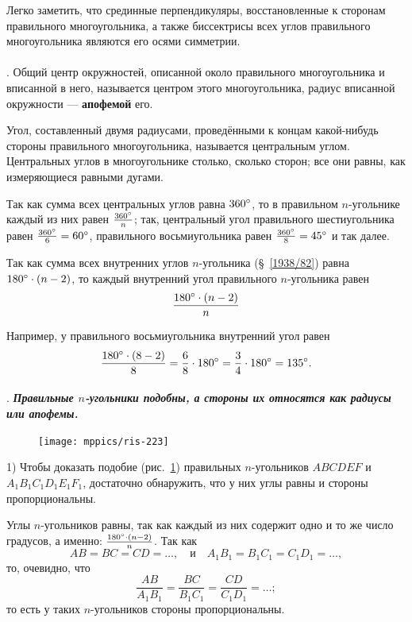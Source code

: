 \documentclass[oneside]{book}
\makeatletter
\newcommand{\rindex}[2][\imki@jobname]{%
  \index[#1]{\detokenize{#2}}%
}
\makeatother
\begin{document}
Легко заметить, что срединные перпендикуляры, восстановленные к сторонам правильного многоугольника, а также биссектрисы всех углов правильного многоугольника являются его осями симметрии.

\paragraph{}\label{1938/217}
.
Общий центр окружностей, описанной около правильного многоугольника и вписанной в него, называется центром этого многоугольника, радиус вписанной окружности — \rindex{апофема}\textbf{апофемой} его.

Угол, составленный двумя радиусами, проведёнными к концам какой-нибудь стороны правильного многоугольника, называется центральным углом.
Центральных углов в многоугольнике столько, сколько сторон;
все они равны, как измеряющиеся равными дугами.

Так как сумма всех центральных углов равна $360\degree$, то в правильном $n$-угольнике каждый из них равен $\tfrac{360\degree}n$;
так, центральный угол правильного шестиугольника равен $\tfrac{360\degree}6\z=60\degree$, правильного восьмиугольника равен $\tfrac{360\degree}8 = 45\degree$ и так далее.

Так как сумма всех внутренних углов $n$-угольника (§~\ref{1938/82}) равна $180\degree\cdot(n-2)$, то каждый внутренний угол правильного $n$-угольника равен
\[\frac{180\degree\cdot(n-2)}{n}\]

Например, у правильного восьмиугольника внутренний угол равен
\[\frac{180\degree\cdot(8-2)}{8}=\frac{6}{8}\cdot 180\degree=\frac{3}{4}\cdot 180\degree=135\degree.\]

\paragraph{}\label{1938/218}
.
\textbf{\emph{Правильные $n$-угольники подобны, а стороны их относятся как радиусы или апофемы.}}

\begin{figure}[h!]
\centering
\texttt{[image: mppics/ris-223]}
\caption{}\label{1938/ris-223}
\end{figure}

1) Чтобы доказать подобие (рис.~\ref{1938/ris-223}) правильных $n$-угольников $ABCDEF$ и $A_1B_1C_1D_1E_1F_1$, достаточно обнаружить, что у них углы равны и стороны пропорциональны.

Углы $n$-угольников равны, так как каждый из них содержит одно и то же число градусов, а именно: $\frac{180\degree\cdot(n-2)}{n}$.
Так как 
\[AB=BC = CD=\dots,
\quad\text{и}\quad A_1B_1=B_1C_1 = C_1D_1=\dots,\]
то, очевидно, что
\[\frac{AB}{A_1B_1}=\frac{BC}{B_1C_1} = \frac{CD}{C_1D_1}=\dots;\]
то есть у таких $n$-угольников стороны пропорциональны.
\end{document}

